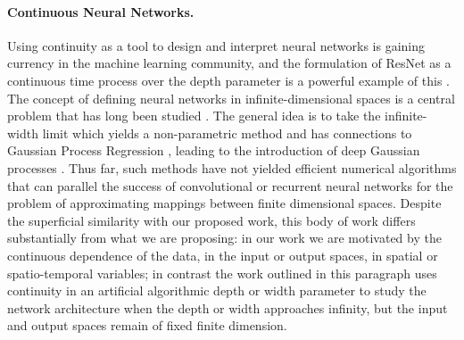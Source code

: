 \paragraph{Continuous Neural Networks.}
Using continuity as a tool to design and interpret neural networks is gaining currency in the machine learning community, and the
formulation of ResNet as a continuous time process over the depth parameter is a powerful example of this
\citep{haber2017stable,weinan2017proposal}. The concept of defining neural networks in infinite-dimensional spaces is a central problem that has long been studied \citep{Williams, Neal, BengioLeRoux, GlobersonLivni, Guss}. The general idea is to take the infinite-width limit which yields a non-parametric method and has connections to Gaussian Process Regression \citep{Neal, MathewsGP, Garriga-AlonsoGP}, leading to the introduction of
deep Gaussian processes \citep{damianou2013deep,aretha}. Thus far, such methods have not yielded efficient numerical algorithms that can parallel the success of convolutional or recurrent neural networks for the problem of approximating mappings between finite dimensional spaces. Despite the superficial similarity with our proposed
work, this body of work differs substantially from what we
are proposing: in our work we are motivated by the continuous dependence
of the data, in the input or output spaces, in spatial or spatio-temporal variables;
in contrast the work outlined in this paragraph uses continuity in an artificial
algorithmic depth or width parameter to study the network architecture when the depth or width approaches
infinity, but the input and output spaces remain of fixed finite dimension.



\iffalse
Another idea is to simply define a sequence of compositions where each layer is a map between infinite-dimensional spaces with a finite-dimensional parametric dependence. This is the approach we take in this work, going a step further by sharing parameters between each layer.
\fi

